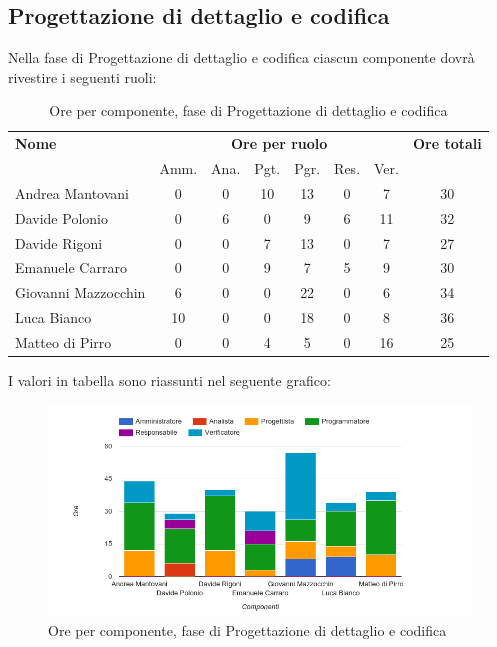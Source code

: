     
    
    
\pagebreak
\subsection{Progettazione di dettaglio e codifica}
Nella fase di Progettazione di dettaglio e codifica ciascun componente dovrà rivestire i seguenti ruoli:

\begin{table}[H]
\begin{tabular}{lccccccc}
\toprule
    \textbf{Nome}  & \multicolumn{6}{c}{\textbf{Ore per ruolo}} & \textbf{Ore totali} \\
     & Amm. & Ana. & Pgt. & Pgr. & Res. & Ver. & \\
    \midrule
    
	   Andrea Mantovani & 0 & 0 & 10 & 13 & 0 & 7 & 30 \\
         Davide Polonio & 0 & 6 & 0 & 9 & 6 & 11 & 32 \\
       	  Davide Rigoni & 0 & 0 & 7 & 13 & 0 & 7 & 27 \\
	   Emanuele Carraro & 0 & 0 & 9 & 7 & 5 & 9 & 30 \\
	Giovanni Mazzocchin & 6 & 0 & 0 & 22 & 0 & 6 & 34 \\
	        Luca Bianco & 10 & 0 & 0 & 18 & 0 & 8 & 36 \\
      	Matteo di Pirro & 0 & 0 & 4 & 5 & 0 & 16 & 25 \\
    
    
    \bottomrule
\end{tabular}
\caption{Ore per componente, fase di Progettazione di dettaglio e codifica}
\end{table}

I valori in tabella sono riassunti nel seguente grafico: \\ 

    \begin{figure}[H]
      \begin{center}
        \includegraphics[width=12cm]{res/img/orePerComponenteProgettazioneDettaglioCodifica.png}
      \caption{Ore per componente, fase di Progettazione di dettaglio e codifica}
      \end{center} 
    \end{figure}    
    
